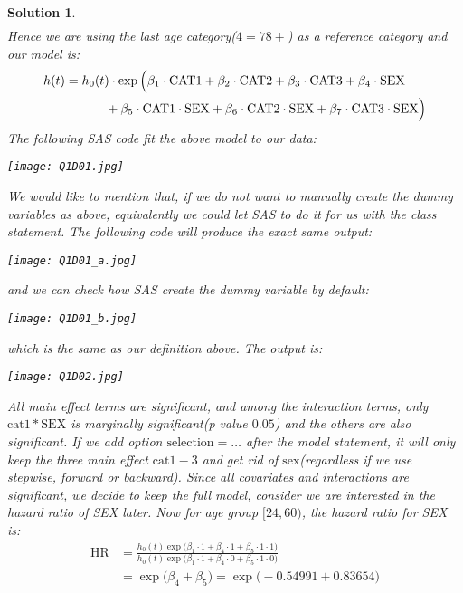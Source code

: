 \documentclass[11pt]{article}
\newtheorem{sol}{Solution}
\begin{document}
\begin{sol}
\begin{align*}
	\end{align*} 
	Hence we are using the last age category($4 = 78+$) as a reference category and our model is:
	\begin{align*}
		h(t) &= h_0(t)\cdot \exp\Big(\beta_1\cdot \text{CAT}1 + \beta_2\cdot \text{CAT}2 + \beta_3\cdot \text{CAT}3 + \beta_4\cdot \text{SEX} \\
		&\ \hskip 1cm + \beta_5 \cdot \text{CAT}1\cdot \text{SEX} + \beta_6 \cdot \text{CAT}2\cdot \text{SEX} + \beta_7\cdot \text{CAT}3\cdot \text{SEX}\Big)
	\end{align*}
	The following SAS code fit the above model to our data:
	\begin{center}
		\texttt{[image: Q1D01.jpg]}
	\end{center}
	We would like to mention that, if we do not want to manually create the dummy variables as above, equivalently we could let SAS to do it for us with the class statement. The following code will produce the exact same output:
	\begin{center}
		\texttt{[image: Q1D01\_a.jpg]}
	\end{center}
	and we can check how SAS create the dummy variable by default:
	\begin{center}
		\texttt{[image: Q1D01\_b.jpg]}
	\end{center}
	which is the same as our definition above.\vskip 2mm
	The output is:
	\begin{center}
		\texttt{[image: Q1D02.jpg]}
	\end{center}
	All main effect terms are significant, and among the interaction terms, only $\text{cat}1\ast \text{SEX}$ is marginally significant(p value $0.05$) and the others are also significant.\vskip 2mm
	If we add option $\text{selection}= \ldots $  after the model statement, it will only keep the three main effect $\text{cat}1-3$ and get rid of $\text{sex}$(regardless if we use stepwise, forward or backward). Since all covariates and interactions are significant, we decide to keep the full model, consider we are interested in the hazard ratio of SEX later.\vskip 2mm
	Now for age group $[24, 60)$, the hazard ratio for SEX is:
	\begin{align*}
		\text{HR} &= \frac{h_0(t)\exp\Big(\beta_1\cdot 1 + \beta_4\cdot 1 + \beta_5\cdot 1\cdot 1\Big)}{h_0(t)\exp\Big(\beta_1\cdot 1 + \beta_4\cdot 0 + \beta_5\cdot 1 \cdot 0\Big)}\\
		&= \exp\Big(\beta_4 + \beta_5\Big) = \exp\Big(-0.54991 + 0.83654\Big)\\

\end{align*}
\end{sol}
\end{document}
